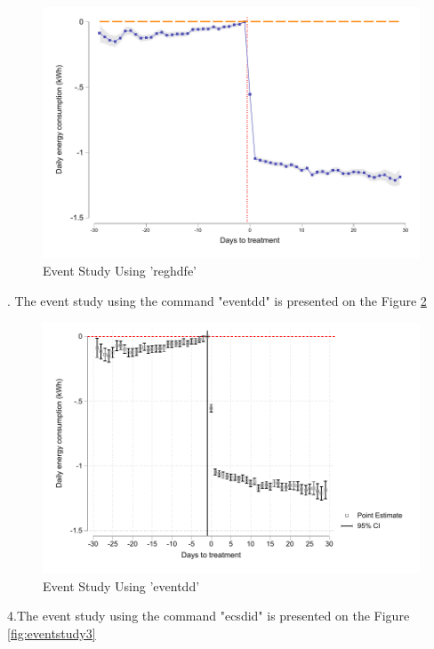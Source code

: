 \documentclass{article}
\begin{document}
\begin{figure}
    \centering
    \includegraphics{homework 6/output/figure/event_study.pdf}
    \caption{Event Study  Using 'reghdfe'}
    \label{fig:eventstudy1}
\end{figure}


\clearpage

. The event study using the command "eventdd" is presented on the Figure \ref{fig:eventstudy2}

\begin{figure}
    \centering
    \includegraphics{homework 6/output/figure/event_study_1.pdf}
    \caption{Event Study  Using 'eventdd'}
    \label{fig:eventstudy2}
\end{figure}

\noindent 4.The event study using the command "ecsdid" is presented on the Figure \ref{fig:eventstudy3}
\end{document}
